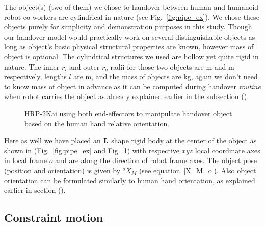 The object(s) (two of them) we chose to handover between human and humanoid robot co-workers are cylindrical in nature (see Fig.~\ref{fig:pipe_ex}). We chose these objects purely for simplicity and demonstration purposes in this study. Though our handover model would practically work on several distinguishable objects as long as object's basic physical structural properties are known, however mass of object is optional. The cylindrical structures we used are hollow yet quite rigid in nature. The inner $r_i$ and outer $r_o$ radii for those two objects are  m and  m respectively, lengths $l$ are  m, and the mass of objects are  kg, again we don't need to know mass of object in advance as it can be computed during handover \textit{routine} when robot carries the object as already explained earlier in the subsection (). 


\begin{figure}[hpt]
	\caption{HRP-2Kai using both end-effectors to manipulate handover object based on the human hand relative orientation.}
	\label{fig:pipe_ori}
\end{figure}


Here as well we have placed an ${\bf L}$ shape rigid body at the center of the object as shown in (Fig.~\ref{fig:pipe_ex} and Fig.~\ref{fig:pipe_ori}) with respective $xyz$ local coordinate axes in local frame $o$ and are along the direction of robot frame axes. The object pose (position and orientation) is given by ${}^{o}{X}_M$ (see equation~\ref{X_M_o}). Also object orientation can be formulated similarly to human hand orientation, as explained earlier in section ().


\subsection{Constraint motion}

